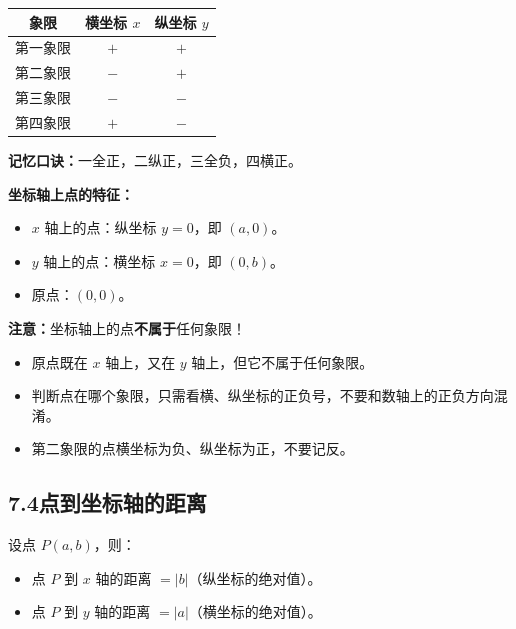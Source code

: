 \documentclass[12pt, a4paper]{ctexart}
\begin{document}
\begin{knowledgebox}[各象限内点的坐标符号]
\begin{center}
\renewcommand{\arraystretch}{1.4}
\begin{tabular}{|c|c|c|}
  \hline
  \textbf{象限} & \textbf{横坐标 $x$} & \textbf{纵坐标 $y$} \\
  \hline
  第一象限 & $+$ & $+$ \\
  \hline
  第二象限 & $-$ & $+$ \\
  \hline
  第三象限 & $-$ & $-$ \\
  \hline
  第四象限 & $+$ & $-$ \\
  \hline
\end{tabular}
\end{center}

\medskip
\textbf{记忆口诀：}一全正，二纵正，三全负，四横正。

\medskip
\textbf{坐标轴上点的特征：}
\begin{itemize}[leftmargin=1.5em]
  \item $x$ 轴上的点：纵坐标 $y = 0$，即 $(a, 0)$。
  \item $y$ 轴上的点：横坐标 $x = 0$，即 $(0, b)$。
  \item 原点：$(0, 0)$。
\end{itemize}

\medskip
\textbf{注意：}坐标轴上的点\textbf{不属于}任何象限！
\end{knowledgebox}

\begin{warnbox}[易错提醒]
\begin{itemize}[leftmargin=1.5em]
  \item 原点既在 $x$ 轴上，又在 $y$ 轴上，但它不属于任何象限。
  \item 判断点在哪个象限，只需看横、纵坐标的正负号，不要和数轴上的正负方向混淆。
  \item 第二象限的点横坐标为负、纵坐标为正，不要记反。
\end{itemize}
\end{warnbox}

\subsection*{7.4\quad 点到坐标轴的距离}

\begin{knowledgebox}[点到坐标轴的距离]
设点 $P(a, b)$，则：
\begin{itemize}[leftmargin=1.5em]
  \item 点 $P$ 到 $x$ 轴的距离 $= |b|$（纵坐标的绝对值）。
  \item 点 $P$ 到 $y$ 轴的距离 $= |a|$（横坐标的绝对值）。
\end{itemize}
\end{knowledgebox}
\end{document}
